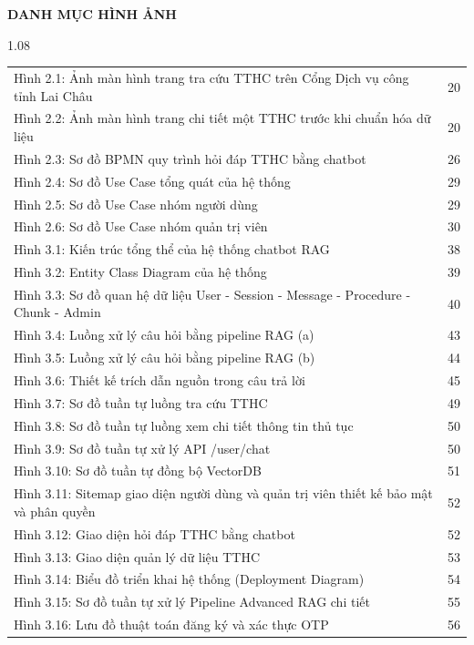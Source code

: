 \begin{center}\Large\bfseries DANH MỤC HÌNH ẢNH\end{center}
\vspace{0.3cm}
\begin{spacing}{1.08}
\begin{longtable}{@{}p{}r@{}}
Hình 2.1: Ảnh màn hình trang tra cứu TTHC trên Cổng Dịch vụ công tỉnh Lai Châu & 20\\
Hình 2.2: Ảnh màn hình trang chi tiết một TTHC trước khi chuẩn hóa dữ liệu & 20\\
Hình 2.3: Sơ đồ BPMN quy trình hỏi đáp TTHC bằng chatbot & 26\\
Hình 2.4: Sơ đồ Use Case tổng quát của hệ thống & 29\\
Hình 2.5: Sơ đồ Use Case nhóm người dùng & 29\\
Hình 2.6: Sơ đồ Use Case nhóm quản trị viên & 30\\
Hình 3.1: Kiến trúc tổng thể của hệ thống chatbot RAG & 38\\
Hình 3.2: Entity Class Diagram của hệ thống & 39\\
Hình 3.3: Sơ đồ quan hệ dữ liệu User - Session - Message - Procedure - Chunk - Admin & 40\\
Hình 3.4: Luồng xử lý câu hỏi bằng pipeline RAG (a) & 43\\
Hình 3.5: Luồng xử lý câu hỏi bằng pipeline RAG (b) & 44\\
Hình 3.6: Thiết kế trích dẫn nguồn trong câu trả lời & 45\\
Hình 3.7: Sơ đồ tuần tự luồng tra cứu TTHC & 49\\
Hình 3.8: Sơ đồ tuần tự luồng xem chi tiết thông tin thủ tục & 50\\
Hình 3.9: Sơ đồ tuần tự xử lý API /user/chat & 50\\
Hình 3.10: Sơ đồ tuần tự đồng bộ VectorDB & 51\\
Hình 3.11: Sitemap giao diện người dùng và quản trị viên thiết kế bảo mật và phân quyền & 52\\
Hình 3.12: Giao diện hỏi đáp TTHC bằng chatbot & 52\\
Hình 3.13: Giao diện quản lý dữ liệu TTHC & 53\\
Hình 3.14: Biểu đồ triển khai hệ thống (Deployment Diagram) & 54\\
Hình 3.15: Sơ đồ tuần tự xử lý Pipeline Advanced RAG chi tiết & 55\\
Hình 3.16: Lưu đồ thuật toán đăng ký và xác thực OTP & 56\\

\end{longtable}
\end{spacing}
